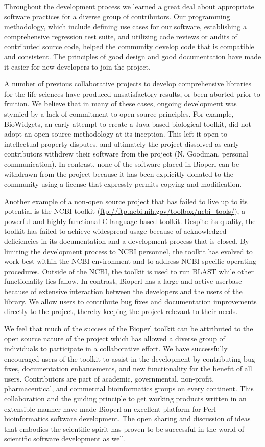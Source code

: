 \documentclass[12pt]{article}
\begin{document}
Throughout the development process we learned a great deal about
appropriate software practices for a diverse group of contributors.
Our programming methodology, which include defining use cases for
our software, establishing a comprehensive regression test suite, and
utilizing code reviews or audits of contributed source code, helped
the community develop code that is compatible and consistent.  The
principles of good design and good documentation have made it easier
for new developers to join the project.

A number of previous collaborative projects to develop comprehensive
libraries for the life sciences have produced unsatisfactory results,
or been aborted prior to fruition.  We believe that in many of these
cases, ongoing development was stymied by a lack of commitment to open
source principles.  For example, BioWidgets, an early attempt to
create a Java-based biological toolkit, did not adopt an open source
methodology at its inception.  This left it open to intellectual
property disputes, and ultimately the project dissolved as early
contributors withdrew their software from the project (N. Goodman,
personal communication).  In contrast, none of the software placed in
Bioperl can be withdrawn from the project because it has been
explicitly donated to the community using a license that expressly
permits copying and modification.

Another example of a non-open source project that has failed to live
up to its potential is the NCBI toolkit
(\url{ftp://ftp.ncbi.nih.gov/toolbox/ncbi_tools/}), a powerful and
highly functional C-language based toolkit.  Despite its quality, the
toolkit has failed to achieve widespread usage because of acknowledged
deficiencies in its documentation and a development process that is
closed.  By limiting the development process to NCBI personnel, the
toolkit has evolved to work best within the NCBI environment and to
address NCBI-specific operating procedures.  Outside of the NCBI, the
toolkit is used to run BLAST while other functionality lies fallow.
In contrast, Bioperl has a large and active userbase because of
extensive interaction between the developers and the users of the
library.  We allow users to contribute bug fixes and documentation
improvements directly to the project, thereby keeping the project
relevant to their needs.

We feel that much of the success of the Bioperl toolkit can be
attributed to the open source nature of the project which has allowed
a diverse group of individuals to participate in a collaborative effort.
We have successfully encouraged users of the toolkit to assist in the
development by contributing bug fixes, documentation enhancements, and
new functionality for the benefit of all users.  Contributors are part
of academic, governmental, non-profit, pharmaceutical, and
commercial bioinformatics groups on every continent.  This collaboration and
the guiding principle to get working products written in an extensible
manner have made Bioperl an excellent platform for Perl bioinformatics
software development.  The open sharing and discussion of ideas that
embodies the scientific spirit has proven to be successful in the
world of scientific software development as well.  
\end{document}
